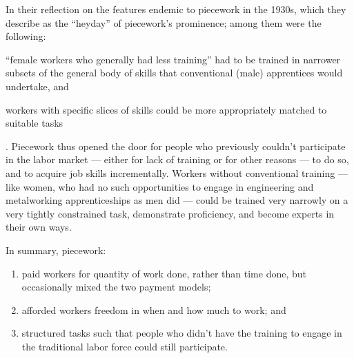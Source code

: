 \documentclass[trackingWork]{subfiles}
\begin{document}
In their reflection on the features endemic to piecework in the 1930s,
which they describe as the ``heyday'' of piecework's prominence;
among them were the following:
\begin{inlinelist}
\item ``female workers who generally had less training'' had to be trained in narrower subsets of the general body of skills that conventional (male) apprentices would undertake, and
\item workers with specific slices of skills could be more appropriately matched to suitable tasks
\end{inlinelist}
\cite{hart2013rise}.
Piecework thus opened the door for people who previously couldn't participate in the labor market
--- either for lack of training or for other reasons ---
to do so, and to acquire job skills incrementally.
Workers without conventional training
--- like women, who had no such opportunities to engage in engineering and metalworking apprenticeships as men did ---
could be trained very narrowly on a very tightly constrained task,
demonstrate proficiency, and become experts in their own ways.

In summary, piecework:
\begin{enumerate}
  \item paid workers for quantity of work done, rather than time done, but occasionally mixed the two payment models;
  \item afforded workers freedom in when and how much to work; and
  \item structured tasks such that people who didn't have the training to engage in the traditional labor force could still participate.
\end{enumerate}
\end{document}
